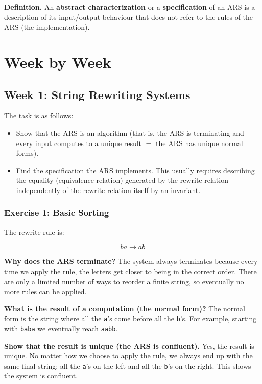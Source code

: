 \documentclass{article}
\theoremstyle{plain}
\theoremstyle{definition}
\theoremstyle{remark}
\begin{document}
\medskip

\textbf{Definition.} 
An \textbf{abstract characterization} or a \textbf{specification} of an ARS is a description of its input/output behaviour that does not refer to the rules of the ARS (the implementation). 

\section{Week by Week}\label{homework}

\subsection{Week 1: String Rewriting Systems}

The task is as follows:

\begin{itemize}
    \item Show that the ARS is an algorithm (that is, the ARS is terminating and every input computes to a unique result $=$ the ARS has unique normal forms).
    \item Find the specification the ARS implements. This usually requires describing the equality (equivalence relation) generated by the rewrite relation independently of the rewrite relation itself by an invariant.
\end{itemize}

\subsubsection{Exercise 1: Basic Sorting}

The rewrite rule is:

\[
    ba \to ab
\]

\textbf{Why does the ARS terminate?}
The system always terminates because every time we apply the rule, the letters get closer to being in the correct order. There are only a limited number of ways to reorder a finite string, so eventually no more rules can be applied.

\textbf{What is the result of a computation (the normal form)?}
The normal form is the string where all the \texttt{a}'s come before all the \texttt{b}'s. For example, starting with \texttt{baba} we eventually reach \texttt{aabb}.

\textbf{Show that the result is unique (the ARS is confluent).}
Yes, the result is unique. No matter how we choose to apply the rule, we always end up with the same final string: all the \texttt{a}'s on the left and all the \texttt{b}'s on the right. This shows the system is confluent.
\end{document}
